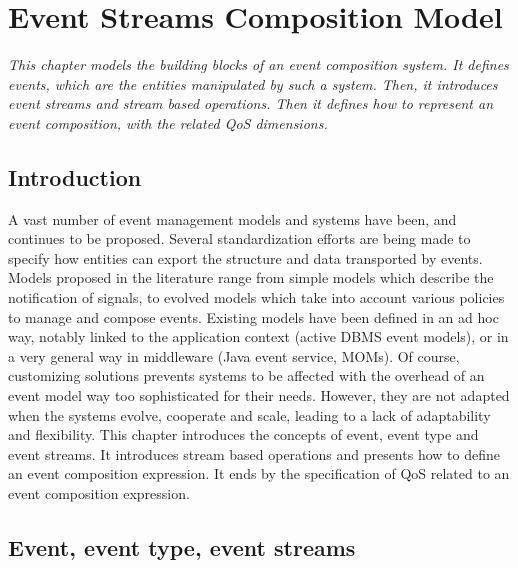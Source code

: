 \chapter{Event Streams Composition Model}
\label{ch3}
\textit{This chapter models the building blocks of an event composition system. It defines events, which are the entities manipulated by such a system. Then, it introduces event 
streams and stream based operations. Then it defines how to represent an event composition, with the related QoS dimensions.}
\vspace{5cm}
\vspace{2ex}\vfill
\minitoc

\section{Introduction}
 \label{ch3:intro}
A vast number of event management models and systems have been, and continues to be proposed. Several standardization efforts are being made to specify how entities can export the structure and data transported by events. Models proposed in the literature range from simple models which describe the notification of signals, to evolved models which take into account various policies to manage and compose events. 
Existing models have been defined in an ad hoc way, notably linked to the application context (active DBMS event models), or in a very general way in middleware (Java event service, MOMs). Of course, customizing solutions prevents systems to be affected with the overhead of an event model way too sophisticated for their needs. However, they are not adapted when the systems evolve, cooperate and scale, leading to a lack of adaptability and flexibility. 
This chapter introduces the concepts of event, event type and event streams. It introduces stream based operations and presents how to define an event composition expression. It ends by the specification of QoS related to an event composition expression.  

\section{Event, event type, event streams}
\label{ch3:sec2}

